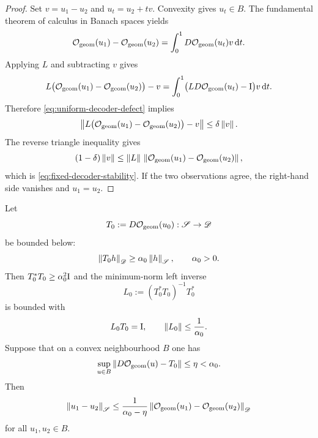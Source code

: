 \begin{proof}
Set $v=u_1-u_2$ and $u_t=u_2+tv$.  Convexity gives $u_t\in B$.  The fundamental theorem of calculus in Banach spaces yields
\[
\mathcal O_{\mathrm{geom}}(u_1)-\mathcal O_{\mathrm{geom}}(u_2)
=
\int_0^1D\mathcal O_{\mathrm{geom}}(u_t)v\,\mathrm d t.
\]
Applying $L$ and subtracting $v$ gives
\[
L\bigl(\mathcal O_{\mathrm{geom}}(u_1)-\mathcal O_{\mathrm{geom}}(u_2)\bigr)-v
=
\int_0^1
\bigl(LD\mathcal O_{\mathrm{geom}}(u_t)-\mathrm I\bigr)v\,\mathrm d t.
\]
Therefore \eqref{eq:uniform-decoder-defect} implies
\[
\left\lVert
L\bigl(\mathcal O_{\mathrm{geom}}(u_1)-\mathcal O_{\mathrm{geom}}(u_2)\bigr)-v
\right\rVert
\le\delta\left\lVert v\right\rVert.
\]
The reverse triangle inequality gives
\[
(1-\delta)\left\lVert v\right\rVert
\le
\left\lVert L\right\rVert\,
\left\lVert\mathcal O_{\mathrm{geom}}(u_1)-\mathcal O_{\mathrm{geom}}(u_2)\right\rVert,
\]
which is \eqref{eq:fixed-decoder-stability}.  If the two observations agree, the right-hand side vanishes and $u_1=u_2$.
\end{proof}

\begin{corollary}
\label{cor:background-decoder-spacetime}
Let
\[
T_0:=D\mathcal O_{\mathrm{geom}}(u_0):\mathscr S\to\mathscr D
\]
be bounded below:
\begin{equation}
\left\lVert T_0h\right\rVert_{\mathscr D}
\ge\alpha_0\left\lVert h\right\rVert_{\mathscr S},
\qquad \alpha_0>0.
\label{eq:background-observation-lower-bound}
\end{equation}
Then $T_0^*T_0\ge\alpha_0^2\mathrm I$ and the minimum-norm left inverse
\begin{equation}
L_0:=(T_0^*T_0)^{-1}T_0^*
\label{eq:background-minimum-decoder}
\end{equation}
is bounded with
\begin{equation}
L_0T_0=\mathrm I,
\qquad
\left\lVert L_0\right\rVert\le\frac1{\alpha_0}.
\label{eq:background-decoder-norm}
\end{equation}
Suppose that on a convex neighbourhood $B$ one has
\begin{equation}
\sup_{u\in B}
\left\lVert D\mathcal O_{\mathrm{geom}}(u)-T_0\right\rVert
\le\eta
<\alpha_0.
\label{eq:derivative-closeness}
\end{equation}
Then
\begin{equation}
\left\lVert u_1-u_2\right\rVert_{\mathscr S}
\le
\frac1{\alpha_0-\eta}
\left\lVert\mathcal O_{\mathrm{geom}}(u_1)-\mathcal O_{\mathrm{geom}}(u_2)\right\rVert_{\mathscr D}
\label{eq:small-ball-geometric-stability}
\end{equation}
for all $u_1,u_2\in B$.
\end{corollary}

